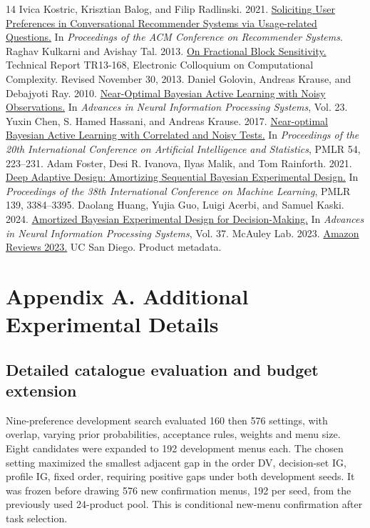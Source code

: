 \documentclass[sigconf,anonymous,review]{acmart}
\begin{document}
\begin{thebibliography}{14}
 Ivica Kostric, Krisztian Balog, and Filip Radlinski. 2021. \href{https://research.google/pubs/soliciting-user-preferences-in-conversational-recommender-systems-via-usage-related-questions/}{Soliciting User Preferences in Conversational Recommender Systems via Usage-related Questions.} In \emph{Proceedings of the ACM Conference on Recommender Systems}. 
 Raghav Kulkarni and Avishay Tal. 2013. \href{https://eccc.weizmann.ac.il/report/2013/168/}{On Fractional Block Sensitivity.} Technical Report TR13-168, Electronic Colloquium on Computational Complexity.  Revised November 30, 2013.
 Daniel Golovin, Andreas Krause, and Debajyoti Ray. 2010. \href{https://proceedings.neurips.cc/paper_files/paper/2010/hash/1e6e0a04d20f50967c64dac2d639a577-Abstract.html}{Near-Optimal Bayesian Active Learning with Noisy Observations.} In \emph{Advances in Neural Information Processing Systems}, Vol. 23. 
 Yuxin Chen, S. Hamed Hassani, and Andreas Krause. 2017. \href{https://proceedings.mlr.press/v54/chen17b.html}{Near-optimal Bayesian Active Learning with Correlated and Noisy Tests.} In \emph{Proceedings of the 20th International Conference on Artificial Intelligence and Statistics}, PMLR 54, 223--231. 
 Adam Foster, Desi R. Ivanova, Ilyas Malik, and Tom Rainforth. 2021. \href{https://proceedings.mlr.press/v139/foster21a.html}{Deep Adaptive Design: Amortizing Sequential Bayesian Experimental Design.} In \emph{Proceedings of the 38th International Conference on Machine Learning}, PMLR 139, 3384--3395. 
 Daolang Huang, Yujia Guo, Luigi Acerbi, and Samuel Kaski. 2024. \href{https://doi.org/10.52202/079017-3475}{Amortized Bayesian Experimental Design for Decision-Making.} In \emph{Advances in Neural Information Processing Systems}, Vol. 37. 
 McAuley Lab. 2023. \href{https://amazon-reviews-2023.github.io/}{Amazon Reviews 2023.} UC San Diego. Product metadata.
\end{thebibliography}
\ifdefined\IncludeResearchAppendix
\clearpage
\onecolumn
\appendix
\section*{Appendix A. Additional Experimental Details}
\subsection*{Detailed catalogue evaluation and budget extension}
Nine-preference development search evaluated 160 then 576 settings, with overlap, varying prior probabilities, acceptance rules, weights and menu size. Eight candidates were expanded to 192 development menus each. The chosen setting maximized the smallest adjacent gap in the order DV, decision-set IG, profile IG, fixed order, requiring positive gaps under both development seeds. It was frozen before drawing 576 new confirmation menus, 192 per seed, from the previously used 24-product pool. This is conditional new-menu confirmation after task selection.
\end{document}
